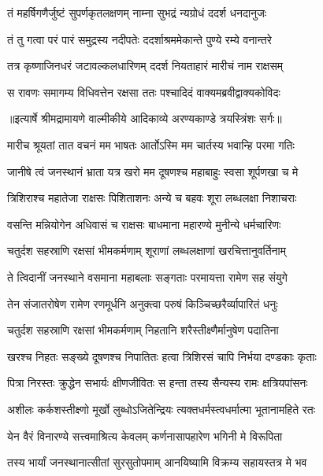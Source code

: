 \twolineshloka
{तं महर्षिगणैर्जुष्टं सुपर्णकृतलक्षणम्}
{नाम्ना सुभद्रं न्यग्रोधं ददर्श धनदानुजः} %

\twolineshloka
{तं तु गत्वा परं पारं समुद्रस्य नदीपतेः}
{ददर्शाश्रममेकान्ते पुण्ये रम्ये वनान्तरे} %

\twolineshloka
{तत्र कृष्णाजिनधरं जटावल्कलधारिणम्}
{ददर्श नियताहारं मारीचं नाम राक्षसम्} %

\twolineshloka
{स रावणः समागम्य विधिवत्तेन रक्षसा}
{ततः पश्चादिदं वाक्यमब्रवीद्वाक्यकोविदः} %


{॥इत्यार्षे श्रीमद्रामायणे वाल्मीकीये आदिकाव्ये अरण्यकाण्डे त्रयस्त्रिंशः सर्गः॥}


\twolineshloka
{मारीच श्रूयतां तात वचनं मम भाषतः}
{आर्तोऽस्मि मम चार्तस्य भवान्हि परमा गतिः} %

\twolineshloka
{जानीषे त्वं जनस्थानं भ्राता यत्र खरो मम}
{दूषणश्च महाबाहुः स्वसा शूर्पणखा च मे} %

\twolineshloka
{त्रिशिराश्च महातेजा राक्षसः पिशिताशनः}
{अन्ये च बहवः शूरा लब्धलक्षा निशाचराः} %

\twolineshloka
{वसन्ति मन्नियोगेन अधिवासं च राक्षसः}
{बाधमाना महारण्ये मुनीन्ये धर्मचारिणः} %

\twolineshloka
{चतुर्दश सहस्राणि रक्षसां भीमकर्मणाम्}
{शूराणां लब्धलक्षाणां खरचित्तानुवर्तिनाम्} %

\twolineshloka
{ते त्विदानीं जनस्थाने वसमाना महाबलाः}
{सङ्गताः परमायत्ता रामेण सह संयुगे} %

\twolineshloka
{तेन संजातरोषेण रामेण रणमूर्धनि}
{अनुक्त्वा परुषं किञ्चिच्छरैर्व्यापारितं धनुः} %

\twolineshloka
{चतुर्दश सहस्राणि रक्षसां भीमकर्मणाम्}
{निहतानि शरैस्तीक्ष्णैर्मानुषेण पदातिना} %

\twolineshloka
{खरश्च निहतः सङ्ख्ये दूषणश्च निपातितः}
{हत्वा त्रिशिरसं चापि निर्भया दण्डकाः कृताः} %

\twolineshloka
{पित्रा निरस्तः क्रुद्धेन सभार्यः क्षीणजीवितः}
{स हन्ता तस्य सैन्यस्य रामः क्षत्रियपांसनः} %

\twolineshloka
{अशीलः कर्कशस्तीक्ष्णो मूर्खो लुब्धोऽजितेन्द्रियः}
{त्यक्तधर्मस्त्वधर्मात्मा भूतानामहिते रतः} %

\twolineshloka
{येन वैरं विनारण्ये सत्त्वमाश्रित्य केवलम्}
{कर्णनासापहारेण भगिनी मे विरूपिता} %

\twolineshloka
{तस्य भार्यां जनस्थानात्सीतां सुरसुतोपमाम्}
{आनयिष्यामि विक्रम्य सहायस्तत्र मे भव} %

